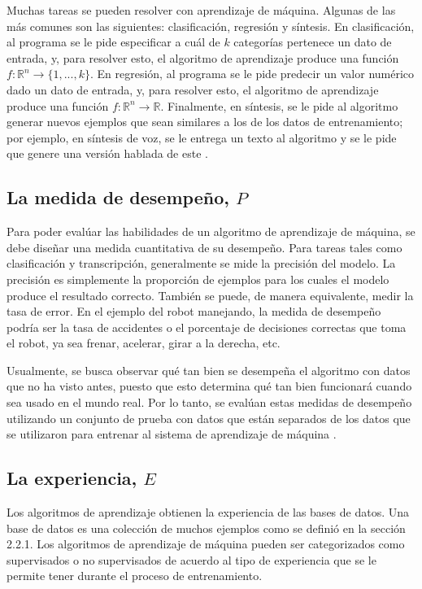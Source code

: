 \vspace{1em}

Muchas tareas se pueden resolver con aprendizaje de máquina. Algunas de las más comunes son las siguientes: clasificación, regresión y síntesis. En clasificación, al programa se le pide especificar a cuál de $k$ categorías pertenece un dato de entrada, y, para resolver esto, el algoritmo de aprendizaje produce una función $f: \mathbb{R}^n \rightarrow \{1,...,k\}$. En regresión, al programa se le pide predecir un valor numérico dado un dato de entrada, y, para resolver esto, el algoritmo de aprendizaje produce una función  $f: \mathbb{R}^n \rightarrow \mathbb{R}$. Finalmente, en síntesis, se le pide al algoritmo generar nuevos ejemplos que sean similares a los de los datos de entrenamiento; por ejemplo, en síntesis de voz, se le entrega un texto al algoritmo y se le pide que genere una versión hablada de este \cite{goodfellow-et-al-2016}.

\subsection{La medida de desempeño, $P$}
Para poder evalúar las habilidades de un algoritmo de aprendizaje de máquina, se debe diseñar una medida cuantitativa de su desempeño. Para tareas tales como clasificación y transcripción, generalmente se mide la precisión del modelo. La precisión es simplemente la proporción de ejemplos para los cuales el modelo produce el resultado correcto. También se puede, de manera equivalente, medir la tasa de error. En el ejemplo del robot manejando, la medida de desempeño podría ser la tasa de accidentes o el porcentaje de decisiones correctas que toma el robot, ya sea frenar, acelerar, girar a la derecha, etc.

\vspace{1em}

Usualmente, se busca observar qué tan bien se desempeña el algoritmo con datos que no ha visto antes, puesto que esto determina qué tan bien funcionará cuando sea usado en el mundo real. Por lo tanto, se evalúan estas medidas de desempeño utilizando un conjunto de prueba con datos que están separados de los datos que se utilizaron para entrenar al sistema de aprendizaje de máquina \cite{goodfellow-et-al-2016}.

\subsection{La experiencia, $E$}
Los algoritmos de aprendizaje obtienen la experiencia de las bases de datos. Una base de datos es una colección de muchos ejemplos como se definió en la sección 2.2.1. Los algoritmos de aprendizaje de máquina pueden ser categorizados como supervisados o no supervisados de acuerdo al tipo de experiencia que se le permite tener durante el proceso de entrenamiento.

